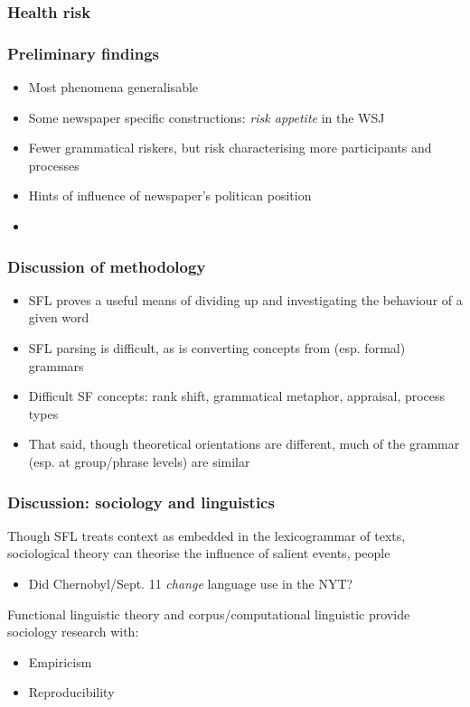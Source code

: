 \documentclass{beamer}       %
\begin{document}
\begin{frame}\frametitle{Health risk}

\end{frame}


\begin{frame}\frametitle{Preliminary findings}
\begin{itemize}
    \item Most phenomena generalisable
    \item Some newspaper specific constructions: \emph{risk appetite} in the WSJ
    \item Fewer grammatical riskers, but risk characterising more participants and processes
    \item Hints of influence of newspaper's politican position
    \item 
\end{itemize}

\end{frame}







\begin{frame}
    \frametitle{Discussion of methodology}
    
    \begin{itemize}
    \item SFL proves a useful means of dividing up and investigating the behaviour of a given word
    \item SFL parsing is difficult, as is converting concepts from (esp. formal) grammars
    \item Difficult SF concepts: rank shift, grammatical metaphor, appraisal, process types \cite{yan_automatic_2014,costetchi_semantic_2013,heyvaert_nominalization_2003}
    \item That said, though theoretical orientations are different, much of the grammar (esp. at group\slash phrase levels) are similar

    \end{itemize}
\end{frame}

\begin{frame}
    \frametitle{Discussion: sociology and linguistics}
    
    Though SFL treats context as embedded in the lexicogrammar of texts, sociological theory can theorise the influence of salient events, people

    \begin{itemize}
        \item Did Chernobyl\slash Sept. 11 \emph{change} language use in the NYT?
    \end{itemize}

    Functional linguistic theory and corpus\slash computational linguistic provide sociology research with:

    \begin{itemize}
        \item Empiricism
        \item Reproducibility
    \end{itemize}
\end{frame}
\end{document}
